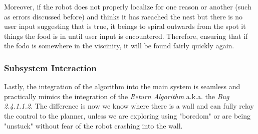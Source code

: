 \documentclass[11pt, a4paper]{article}
\begin{document}
Moreover, if the robot does not properly localize for one reason or another (such as errors discussed before) and thinks it has raeached the nest but there is no user input suggesting that is true, it beings to spiral outwards from the spot it things the food is in until user input is encountered. Therefore, ensuring that if the fodo is somewhere in the viscinity, it will be found fairly quickly again. 


\subsubsection{Subsystem Interaction}

Lastly, the integration of the algorithm into the main system is seamless and practically mimics the integration of the \textit{Return Algorithm}\cite{task2_report} a.k.a. the \textit{Bug 2.4.1.1.2}. The difference is now we know where there is a wall and can fully relay the control to the planner, unless we are exploring using "boredom" or are being "unstuck" without fear of the robot crashing into the wall.


\end{document}

